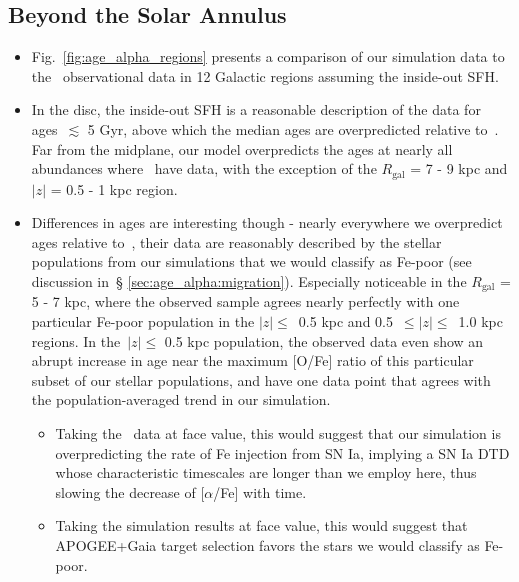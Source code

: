 \documentclass[fleqn, usenatbib]{mnras}
\begin{document}
\subsection{Beyond the Solar Annulus} 
\label{sec:age_alpha:beyond_solar_annulus} 
\begin{itemize} 
	\item Fig.~\ref{fig:age_alpha_regions} presents a comparison of our 
	simulation data to the~\citet{Feuillet2019} observational data in 12 
	Galactic regions assuming the inside-out SFH. 

	\item In the disc, the inside-out SFH is a reasonable description of the 
	data for ages~$\lesssim$ 5 Gyr, above which the median ages are 
	overpredicted relative to~\citet{Feuillet2019}. Far from the midplane, our 
	model overpredicts the ages at nearly all abundances 
	where~\citet{Feuillet2019} have data, with the exception of the 
	$R_\text{gal}$ = 7 - 9 kpc and $\left|z\right|$ = 0.5 - 1 kpc region. 

	\item Differences in ages are interesting though - nearly everywhere we 
	overpredict ages relative to~\citet{Feuillet2019}, their data are 
	reasonably described by the stellar populations from our simulations that 
	we would classify as Fe-poor (see discussion in~\S 
	\ref{sec:age_alpha:migration}). Especially noticeable in the
	$R_\text{gal}$ = 5 - 7 kpc, where the observed sample agrees nearly 
	perfectly with one particular Fe-poor population in the 
	$\left|z\right|\leq$~0.5 kpc and 0.5~$\leq\left|z\right|\leq$~1.0 kpc 
	regions. In the~$\left|z\right|\leq$ 0.5 kpc population, the observed 
	data even show an abrupt increase in age near the maximum [O/Fe] ratio of 
	this particular subset of our stellar populations, and have one data point 
	that agrees with the population-averaged trend in our simulation. 
	\begin{itemize} 
		\item Taking the~\citet{Feuillet2019} data at face value, this would 
		suggest that our simulation is overpredicting the rate of Fe injection 
		from SN Ia, implying a SN Ia DTD whose characteristic timescales are 
		longer than we employ here, thus slowing the decrease of [$\alpha$/Fe] 
		with time. 

		\item Taking the simulation results at face value, this would suggest 
		that APOGEE+Gaia target selection favors the stars we would classify 
		as Fe-poor. 


\end{itemize}
\end{itemize}
\end{document}
